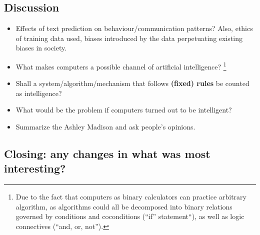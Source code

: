 \documentclass[12pt]{article}
\theoremstyle{definition}
\theoremstyle{plain}
\begin{document}

\subsection{Discussion}
\begin{itemize}
    \item Effects of text prediction on behaviour/communication patterns? Also,
        ethics of training data used, biases introduced by the data perpetuating
        existing biases in society.

    \item What makes computers a possible channel of artificial
        intelligence?
        \footnote{Due to the fact that computers as binary calculators can
            practice arbitrary algorithm, as algorithms could all be decomposed
            into binary relations governed by conditions and coconditions
            (``if'' statement``), as well as logic connectives (``and, or,
            not'').
        }

    \item Shall a system/algorithm/mechanism that follows \textbf{(fixed) rules}
        be counted as intelligence?

    \item What would be the problem if computers turned out to be intelligent?

    \item Summarize the Ashley Madison and ask people's opinions.

\end{itemize}

\subsection{Closing: any changes in what was most interesting?}
\end{document}
